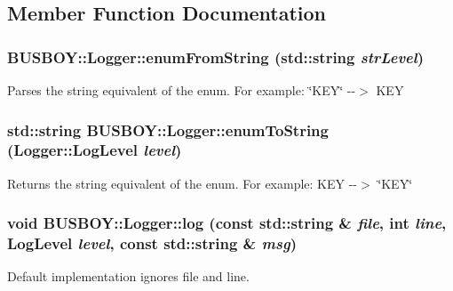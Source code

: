 \subsection{Member Function Documentation}
\hypertarget{classBUSBOY_1_1Logger_a6be1115b0616e3a68ef1a89d16d49828}{
\subsubsection[{enumFromString}]{ BUSBOY::Logger::enumFromString (std::string {\em strLevel})}}
\label{classBUSBOY_1_1Logger_a6be1115b0616e3a68ef1a89d16d49828}


Parses the string equivalent of the enum. For example: \char`\"{}KEY\char`\"{} -\/-\/$>$ KEY \hypertarget{classBUSBOY_1_1Logger_ab12dfc555373bfa7ce21d274ab08a417}{
\subsubsection[{enumToString}]{\setlength{\rightskip}{0pt plus 5cm}std::string BUSBOY::Logger::enumToString ({\bf Logger::LogLevel} {\em level})}}
\label{classBUSBOY_1_1Logger_ab12dfc555373bfa7ce21d274ab08a417}


Returns the string equivalent of the enum. For example: KEY -\/-\/$>$ \char`\"{}KEY\char`\"{} \hypertarget{classBUSBOY_1_1Logger_a7eec0eff91908006defd671e915ee221}{
\subsubsection[{log}]{\setlength{\rightskip}{0pt plus 5cm}void BUSBOY::Logger::log (const std::string \& {\em file}, \/  int {\em line}, \/  {\bf LogLevel} {\em level}, \/  const std::string \& {\em msg})}}
\label{classBUSBOY_1_1Logger_a7eec0eff91908006defd671e915ee221}


Default implementation ignores file and line. 

